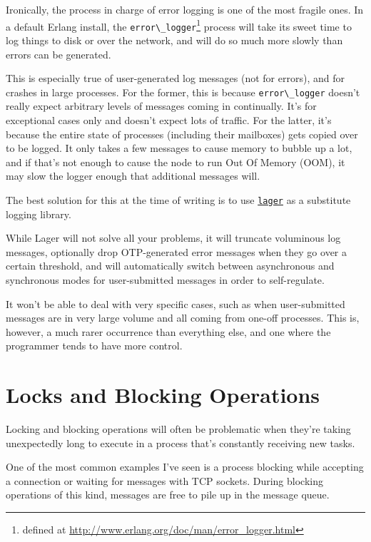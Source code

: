 \documentclass[11pt, oneside]{book}   	%
\newcommand{\module}[1]{\Verb`#1`}
\begin{document}
Ironically, the process in charge of error logging is one of the most fragile ones. In a default Erlang install, the \module{error\_logger}\footnote{defined at \href{http://www.erlang.org/doc/man/error\_logger.html}{http://www.erlang.org/doc/man/error\_logger.html}} process will take its sweet time to log things to disk or over the network, and will do so much more slowly than errors can be generated.

This is especially true of user-generated log messages (not for errors), and for crashes in large processes. For the former, this is because \module{error\_logger} doesn't really expect arbitrary levels of messages coming in continually. It's for exceptional cases only and doesn't expect lots of traffic. For the latter, it's because the entire state of processes (including their mailboxes) gets copied over to be logged. It only takes a few messages to cause memory to bubble up a lot, and if that's not enough to cause the node to run Out Of Memory (OOM), it may slow the logger enough that additional messages will.

The best solution for this at the time of writing is to use \href{https://github.com/basho/lager}{\module{lager}} as a substitute logging library.

While Lager will not solve all your problems, it will truncate voluminous log messages, optionally drop OTP-generated error messages when they go over a certain threshold, and will automatically switch between asynchronous and synchronous modes for user-submitted messages in order to self-regulate.

It won't be able to deal with very specific cases, such as when user-submitted messages are in very large volume and all coming from one-off processes. This is, however, a much rarer occurrence than everything else, and one where the programmer tends to have more control.


\section{Locks and Blocking Operations}

Locking and blocking operations will often be problematic when they're taking unexpectedly long to execute in a process that's constantly receiving new tasks.

One of the most common examples I've seen is a process blocking while accepting a connection or waiting for messages with TCP sockets. During blocking operations of this kind, messages are free to pile up in the message queue.
\end{document}
